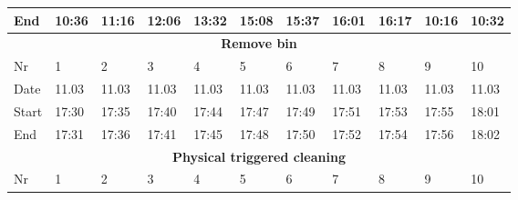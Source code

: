 \begin{table}[H]
\begin{tabular}{|lllllllllll|}
\multicolumn{1}{|l|}{End}    & \multicolumn{1}{l|}{10:36} & \multicolumn{1}{l|}{11:16} & \multicolumn{1}{l|}{12:06} & \multicolumn{1}{l|}{13:32} & \multicolumn{1}{l|}{15:08} & \multicolumn{1}{l|}{15:37} & \multicolumn{1}{l|}{16:01} & \multicolumn{1}{l|}{16:17} & \multicolumn{1}{l|}{10:16} & 10:32 \\ \hline
\multicolumn{11}{|c|}{\textbf{Remove bin}}                                                                                                                                                                                                                                                                \\ \hline
\multicolumn{1}{|l|}{Nr} & \multicolumn{1}{l|}{1}     & \multicolumn{1}{l|}{2}     & \multicolumn{1}{l|}{3}     & \multicolumn{1}{l|}{4}     & \multicolumn{1}{l|}{5}     & \multicolumn{1}{l|}{6}     & \multicolumn{1}{l|}{7}     & \multicolumn{1}{l|}{8}     & \multicolumn{1}{l|}{9}     & 10    \\ \hline
\multicolumn{1}{|l|}{Date}   & \multicolumn{1}{l|}{11.03} & \multicolumn{1}{l|}{11.03} & \multicolumn{1}{l|}{11.03} & \multicolumn{1}{l|}{11.03} & \multicolumn{1}{l|}{11.03} & \multicolumn{1}{l|}{11.03} & \multicolumn{1}{l|}{11.03} & \multicolumn{1}{l|}{11.03} & \multicolumn{1}{l|}{11.03} & 11.03 \\ \hline
\multicolumn{1}{|l|}{Start}  & \multicolumn{1}{l|}{17:30} & \multicolumn{1}{l|}{17:35} & \multicolumn{1}{l|}{17:40} & \multicolumn{1}{l|}{17:44} & \multicolumn{1}{l|}{17:47} & \multicolumn{1}{l|}{17:49} & \multicolumn{1}{l|}{17:51} & \multicolumn{1}{l|}{17:53} & \multicolumn{1}{l|}{17:55} & 18:01 \\ \hline
\multicolumn{1}{|l|}{End}    & \multicolumn{1}{l|}{17:31} & \multicolumn{1}{l|}{17:36} & \multicolumn{1}{l|}{17:41} & \multicolumn{1}{l|}{17:45} & \multicolumn{1}{l|}{17:48} & \multicolumn{1}{l|}{17:50} & \multicolumn{1}{l|}{17:52} & \multicolumn{1}{l|}{17:54} & \multicolumn{1}{l|}{17:56} & 18:02 \\ \hline
\multicolumn{11}{|c|}{\textbf{Physical triggered cleaning}}                                                                                                                                                                                                                                               \\ \hline
\multicolumn{1}{|l|}{Nr} & \multicolumn{1}{l|}{1}     & \multicolumn{1}{l|}{2}     & \multicolumn{1}{l|}{3}     & \multicolumn{1}{l|}{4}     & \multicolumn{1}{l|}{5}     & \multicolumn{1}{l|}{6}     & \multicolumn{1}{l|}{7}     & \multicolumn{1}{l|}{8}     & \multicolumn{1}{l|}{9}     & 10    \\ \hline

\end{tabular}
\end{table}
